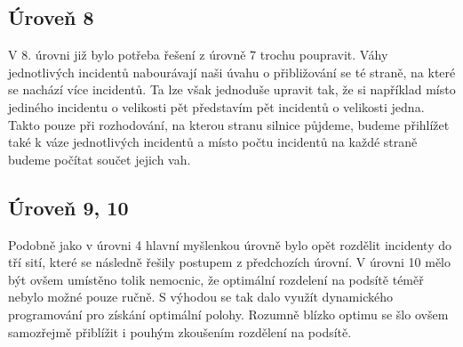 \documentclass[12pt,a4paper]{article}
\begin{document}
\subsection*{Úroveň 8}
V 8. úrovni již bylo potřeba řešení z úrovně 7 trochu poupravit. Váhy jednotlivých incidentů nabourávají naši úvahu o přibližování se té straně, na které se nachází více incidentů.
Ta lze však jednoduše upravit tak, že si například místo jediného incidentu o velikosti pět představím pět incidentů o velikosti jedna. Takto pouze při rozhodování, na kterou stranu silnice půjdeme, budeme přihlížet také k váze jednotlivých incidentů a místo počtu incidentů na každé straně budeme počítat součet jejich vah.

\subsection*{Úroveň 9, 10}
Podobně jako v úrovni 4 hlavní myšlenkou úrovně bylo opět rozdělit incidenty do tří sití, které se následně řešily postupem z předchozích úrovní. V úrovni 10 mělo být ovšem umístěno tolik nemocnic, že optimální rozdelení na podsítě téměř nebylo možné pouze ručně. S výhodou se tak dalo využít dynamického programování pro získání optimální polohy. Rozumně blízko optimu se šlo ovšem samozřejmě přiblížit i pouhým zkoušením rozdělení na podsítě.
\end{document}
